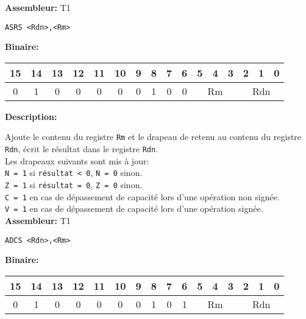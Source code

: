 \textbf{Assembleur:} T1

\begin{lstlisting}
ASRS <Rdn>,<Rm>
\end{lstlisting}

\textbf{Binaire:}\\

\begin{tabular}{| c c c c c c c c c c c c c c c c |}
\hline
15 & 14 & 13 & 12 & 11 & 10 & \multicolumn{1}{|c}{9} & 8 & 7 & 6 & \multicolumn{1}{|c}{5} & 4 & 3 & \multicolumn{1}{|c}{2} & 1 & 0 \\
\hline
0 & 1 & 0 & 0 & 0 & 0 & \multicolumn{1}{|c}{0} & 1 & 0 & 0 & \multicolumn{3}{|c}{Rm} & \multicolumn{3}{|c|}{Rdn} \\
\hline
\end{tabular}



\textbf{Description: }

Ajoute le contenu du registre \texttt{Rm} et le drapeau de retenu au contenu du registre \texttt{Rdn}, écrit le résultat dans le registre \texttt{Rdn}.\\
Les drapeaux suivants sont mis à jour:\\
\texttt{N = 1} si \texttt{résultat < 0}, \texttt{N = 0} sinon.\\
\texttt{Z = 1} si \texttt{résultat = 0}, \texttt{Z = 0} sinon.\\
\texttt{C = 1} en cas de dépassement de capacité lors d'une opération non signée.\\
\texttt{V = 1} en cas de dépassement de capacité lors d'une opération signée.\\

\textbf{Assembleur:} T1

\begin{lstlisting}
ADCS <Rdn>,<Rm>
\end{lstlisting}

\textbf{Binaire:}\\

\begin{tabular}{| c c c c c c c c c c c c c c c c |}
\hline
15 & 14 & 13 & 12 & 11 & 10 & \multicolumn{1}{|c}{9} & 8 & 7 & 6 & \multicolumn{1}{|c}{5} & 4 & 3 & \multicolumn{1}{|c}{2} & 1 & 0 \\
\hline
0 & 1 & 0 & 0 & 0 & 0 & \multicolumn{1}{|c}{0} & 1 & 0 & 1 & \multicolumn{3}{|c}{Rm} & \multicolumn{3}{|c|}{Rdn} \\
\hline
\end{tabular}

